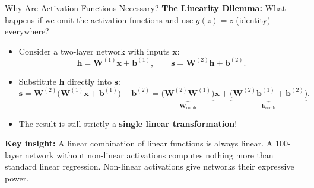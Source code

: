 \begin{frame}{Why Are Activation Functions Necessary?}
    \textbf{The Linearity Dilemma:} What happens if we omit the activation functions and use $g(z) = z$ (identity) everywhere?
    \begin{itemize}
        \item Consider a two-layer network with inputs $\mathbf{x}$:
        \[
            \mathbf{h} = \mathbf{W}^{(1)}\mathbf{x} + \mathbf{b}^{(1)}, \qquad
            \mathbf{s} = \mathbf{W}^{(2)}\mathbf{h} + \mathbf{b}^{(2)}.
        \]
        \item Substitute $\mathbf{h}$ directly into $\mathbf{s}$:
        \[
            \mathbf{s} = \mathbf{W}^{(2)}\bigl(\mathbf{W}^{(1)}\mathbf{x} + \mathbf{b}^{(1)}\bigr) + \mathbf{b}^{(2)}
            = \underbrace{\bigl(\mathbf{W}^{(2)}\mathbf{W}^{(1)}\bigr)}_{\mathbf{W}_{\text{comb}}}\mathbf{x} + \underbrace{\bigl(\mathbf{W}^{(2)}\mathbf{b}^{(1)} + \mathbf{b}^{(2)}\bigr)}_{\mathbf{b}_{\text{comb}}}.
        \]
        \item The result is still strictly a \textbf{single linear transformation}!
    \end{itemize}
    \pause
    \svspace{0.3em}
    \textbf{Key insight:} A linear combination of linear functions is always linear. A 100-layer network without non-linear activations computes nothing more than standard linear regression. Non-linear activations give networks their expressive power.
\end{frame}

